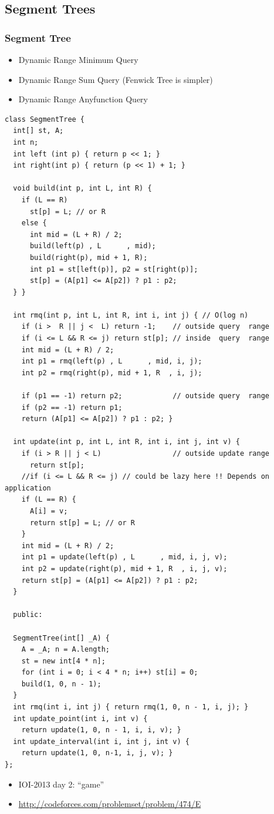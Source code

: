 \documentclass[10pt,svgnames,usenames,table]{beamer} %
\begin{document}
\subsection{Segment Trees}
\begin{frame}
  \frametitle{Segment Tree}
  \begin{itemize}
    \item Dynamic Range Minimum Query
    \item Dynamic Range Sum Query (Fenwick Tree is simpler)
    \item Dynamic Range Anyfunction Query
  \end{itemize}
  \begin{lstlisting}
class SegmentTree {
  int[] st, A;
  int n;
  int left (int p) { return p << 1; }
  int right(int p) { return (p << 1) + 1; }

  void build(int p, int L, int R) {
    if (L == R)
      st[p] = L; // or R
    else {
      int mid = (L + R) / 2;
      build(left(p) , L      , mid);
      build(right(p), mid + 1, R);
      int p1 = st[left(p)], p2 = st[right(p)];
      st[p] = (A[p1] <= A[p2]) ? p1 : p2;
  } }

  int rmq(int p, int L, int R, int i, int j) { // O(log n)
    if (i >  R || j <  L) return -1;    // outside query  range
    if (i <= L && R <= j) return st[p]; // inside  query  range
    int mid = (L + R) / 2;
    int p1 = rmq(left(p) , L      , mid, i, j);
    int p2 = rmq(right(p), mid + 1, R  , i, j);

    if (p1 == -1) return p2;            // outside query  range
    if (p2 == -1) return p1;
    return (A[p1] <= A[p2]) ? p1 : p2; }

  int update(int p, int L, int R, int i, int j, int v) {
    if (i > R || j < L)                 // outside update range
      return st[p];
    //if (i <= L && R <= j) // could be lazy here !! Depends on application
    if (L == R) {
      A[i] = v;
      return st[p] = L; // or R
    }
    int mid = (L + R) / 2;
    int p1 = update(left(p) , L      , mid, i, j, v);
    int p2 = update(right(p), mid + 1, R  , i, j, v);
    return st[p] = (A[p1] <= A[p2]) ? p1 : p2;
  }

  public:

  SegmentTree(int[] _A) {
    A = _A; n = A.length;
    st = new int[4 * n];
    for (int i = 0; i < 4 * n; i++) st[i] = 0;
    build(1, 0, n - 1);
  }
  int rmq(int i, int j) { return rmq(1, 0, n - 1, i, j); }
  int update_point(int i, int v) {
    return update(1, 0, n - 1, i, i, v); }
  int update_interval(int i, int j, int v) {
    return update(1, 0, n-1, i, j, v); }
};
  \end{lstlisting}
  \begin{itemize}
    \item IOI-2013 day 2: ``game''
    \item \url{http://codeforces.com/problemset/problem/474/E}
  \end{itemize}
\end{frame}
\end{document}
